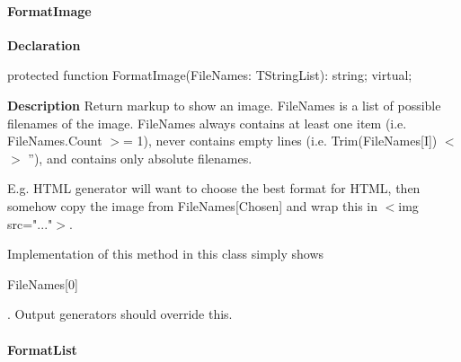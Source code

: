 \documentclass{report}
\newif\ifpdf
\begin{document}
\paragraph*{FormatImage}\hspace*{\fill}

\label{PasDoc_Gen.TDocGenerator-FormatImage}
\begin{list}{}{
\setlength{\itemindent}{0cm}
\setlength{\listparindent}{0cm}
\setlength{\leftmargin}{\evensidemargin}
\addtolength{\leftmargin}{\tmplength}
\settowidth{\labelsep}{X}
\addtolength{\leftmargin}{\labelsep}
\setlength{\labelwidth}{\tmplength}
}
\item[\textbf{Declaration}\hfill]
\ifpdf
\begin{flushleft}
\fi
\begin{ttfamily}
protected function FormatImage(FileNames: TStringList): string; virtual;\end{ttfamily}

\ifpdf
\end{flushleft}
\fi

\par
\item[\textbf{Description}]
Return markup to show an image. FileNames is a list of possible filenames of the image. FileNames always contains at least one item (i.e. FileNames.Count {$>$}= 1), never contains empty lines (i.e. Trim(FileNames[I]) {$<$}{$>$} ''), and contains only absolute filenames.

E.g. HTML generator will want to choose the best format for HTML, then somehow copy the image from FileNames[Chosen] and wrap this in {$<$}img src="..."{$>$}.

Implementation of this method in this class simply shows \begin{ttfamily}FileNames[0]\end{ttfamily}. Output generators should override this.

\end{list}
\paragraph*{FormatList}\hspace*{\fill}
\end{document}
